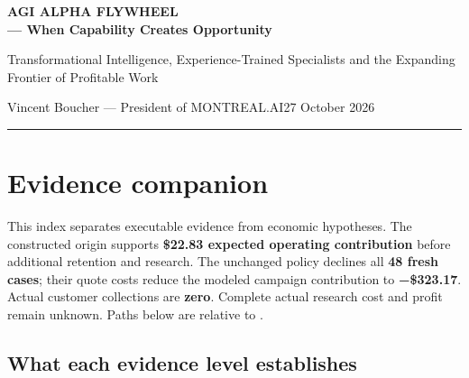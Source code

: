 \documentclass[11pt,letterpaper]{article}
\begin{document}
{\sffamily\fontsize{18}{22}\selectfont\bfseries\color{navy}AGI ALPHA FLYWHEEL\\— When Capability Creates Opportunity\par}
{\sffamily\large\color{teal}Transformational Intelligence,
Experience-Trained Specialists and the Expanding Frontier of Profitable
Work\par}
{\normalsize Vincent Boucher --- President of
MONTREAL.AI\hfill 27 October 2026\par}
\vspace{0.3cm}\hrule\vspace{0.3cm}
\hypertarget{evidence-companion}{%
\section{Evidence companion}\label{evidence-companion}}

This index separates executable evidence from economic hypotheses. The
constructed origin supports \textbf{\$22.83 expected operating
contribution} before additional retention and research. The unchanged
policy declines all \textbf{48 fresh cases}; their quote costs reduce
the modeled campaign contribution to \textbf{−\$323.17}. Actual customer
collections are \textbf{zero}. Complete actual research cost and profit
remain unknown. Paths below are relative to
.

\hypertarget{what-each-evidence-level-establishes}{%
\subsection{What each evidence level
establishes}\label{what-each-evidence-level-establishes}}
\end{document}
